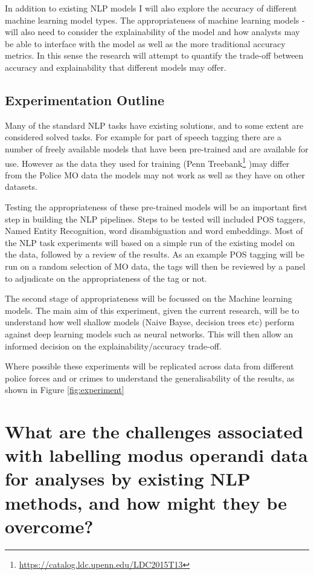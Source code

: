 In addition to existing NLP models I will also explore the accuracy of different machine learning model types. The appropriateness of machine learning models - will also need to consider the explainability of the model and how analysts may be able to interface with the model as well as the more traditional accuracy metrics. In this sense the research will  attempt to quantify the trade-off between accuracy and explainability that different models may offer.


\subsection{Experimentation Outline}Many of the standard NLP tasks have existing solutions, and to some extent are considered solved tasks. For example for part of speech tagging there are a number of freely available models \parencite{toutanova2003feature} that have been pre-trained and are available for use. However as the data they used for training (Penn Treebank\footnote{\protect\url{https://catalog.ldc.upenn.edu/LDC2015T13}} )may differ from the Police MO data the models may not work as well as they have on other datasets. 

Testing the appropriateness of these pre-trained models will be an important first step in building the NLP pipelines. Steps to be tested will included POS taggers, Named Entity Recognition, word disambiguation and word embeddings. Most of the NLP task experiments will based on a simple run of the existing model on the data, followed by a review of the results. As an example POS tagging will be run on a random selection of MO data, the tags will then be reviewed by a panel to adjudicate on the appropriateness of the tag or not.

The second stage of appropriateness will be focussed on the Machine learning models. The main aim of this experiment, given the current research, will be to understand how well shallow models (Naive Bayse, decision trees etc) perform against deep learning models such as neural networks. This will then allow an informed decision on the explainability/accuracy trade-off. 

Where possible these experiments will be replicated across data from different police forces and or crimes to understand the generalisability of the results, as shown in Figure \ref{fig:experiment}


\section{What are the challenges associated with labelling modus operandi data for analyses by existing NLP methods, and how might they be overcome?  }

